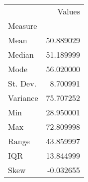 \begin{tabu}{lr}
\toprule
 & Values \\
Measure &  \\
\midrule
Mean & 50.889029 \\
Median & 51.189999 \\
Mode & 56.020000 \\
St. Dev. & 8.700991 \\
Variance & 75.707252 \\
Min & 28.950001 \\
Max & 72.809998 \\
Range & 43.859997 \\
IQR & 13.844999 \\
Skew & -0.032655 \\
\bottomrule
\end{tabu}
